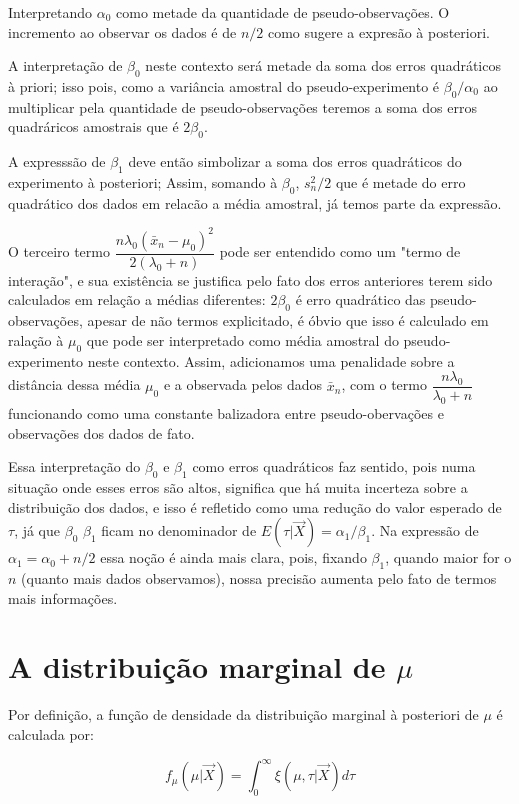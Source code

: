 \documentclass[a4paper]{article}
\newcommand{\vX}{\vec X}
\newcommand{\xn}{\bar{x}_n}
\newcommand{\sn}{s^2_n}
\begin{document}
Interpretando $\alpha_0$ como metade da quantidade de pseudo-observações. O incremento ao observar os dados é de $n/2$ como sugere a expresão à posteriori.

A interpretação de $\beta_0$ neste contexto será metade da soma dos erros quadráticos à priori; isso pois, como a variância amostral do pseudo-experimento é $\beta_0/\alpha_0$ ao multiplicar pela quantidade de pseudo-observações teremos a soma dos erros quadráricos amostrais que é $2\beta_0$.

A expresssão de $\beta_1$ deve então simbolizar a soma dos erros quadráticos do experimento à posteriori; Assim, somando à $\beta_0$, $\sn/2$ que é metade do erro quadrático dos dados em relacão a média amostral, já temos parte da expressão. 

O terceiro termo $\dfrac{n\lambda_0(\xn-\mu_0)^2}{2(\lambda_0+n)}$ pode ser entendido como um "termo de interação", e sua existência se justifica pelo fato dos erros anteriores terem sido calculados em relação a médias diferentes: $2\beta_0$ é erro quadrático das pseudo-observações, apesar de não termos explicitado, é óbvio que isso é calculado em ralação à $\mu_0$ que pode ser interpretado como média amostral do pseudo-experimento neste contexto. Assim, adicionamos uma penalidade sobre a distância dessa média $\mu_0$ e a observada pelos dados $\xn$, com o termo $\dfrac{n\lambda_0}{\lambda_0+n}$ funcionando como uma constante balizadora entre pseudo-obervações e observações dos dados de fato.

Essa interpretação do $\beta_0$ e $\beta_1$ como erros quadráticos faz sentido, pois numa situação onde esses erros são altos, significa que há muita incerteza sobre a distribuição dos dados, e isso é refletido como uma redução do valor esperado de $\tau$, já que $\beta_0$ $\beta_1$ ficam no denominador de $E(\tau|\vX)=\alpha_1/\beta_1$. Na expressão de $\alpha_1=\alpha_0+n/2$ essa noção é ainda mais clara, pois, fixando $\beta_1$, quando maior for o $n$ (quanto mais dados observamos), nossa precisão aumenta pelo fato de termos mais informações.


\section{A distribuição marginal de $\mu$}

Por definição, a função de densidade da distribuição marginal à posteriori de $\mu$ é calculada por:

\[f_{\mu}(\mu|\vX)=\int_{0}^{\infty}\xi(\mu,\tau|\vX)d\tau\]
\end{document}
